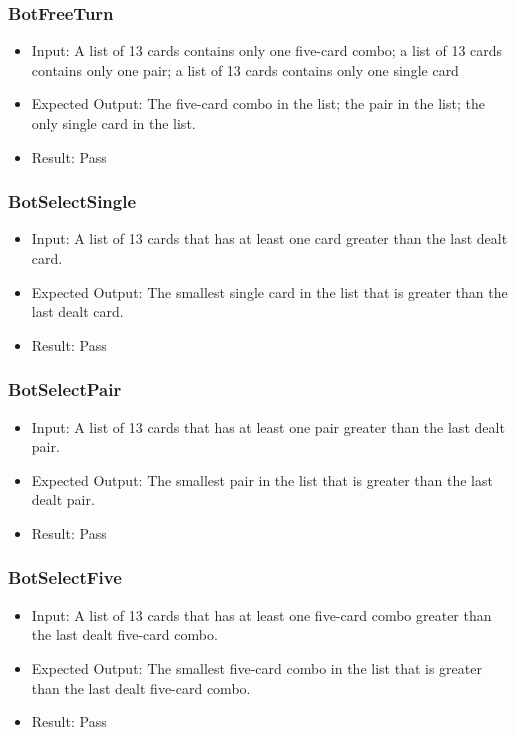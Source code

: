\documentclass[12pt, titlepage]{article}
\begin{document}
\subsubsection{BotFreeTurn}
\begin{itemize}
    \item Input: A list of 13 cards contains only one five-card combo; a list of 13 cards contains only one pair; a list of 13 cards contains only one single card
    \item Expected Output: The five-card combo in the list; the pair in the list; the only single card in the list.
    \item Result: Pass
\end{itemize}

\subsubsection{BotSelectSingle}
\begin{itemize}
    \item Input: A list of 13 cards that has at least one card greater than the last dealt card.
    \item Expected Output: The smallest single card in the list that is greater than the last dealt card.
    \item Result: Pass
\end{itemize}

\subsubsection{BotSelectPair}
\begin{itemize}
    \item Input: A list of 13 cards that has at least one pair greater than the last dealt pair.
    \item Expected Output: The smallest pair in the list that is greater than the last dealt pair.
    \item Result: Pass
\end{itemize}

\subsubsection{BotSelectFive}
\begin{itemize}
    \item Input: A list of 13 cards that has at least one five-card combo greater than the last dealt five-card combo.
    \item Expected Output: The smallest five-card combo in the list that is greater than the last dealt five-card combo.
    \item Result: Pass
\end{itemize}
\end{document}
